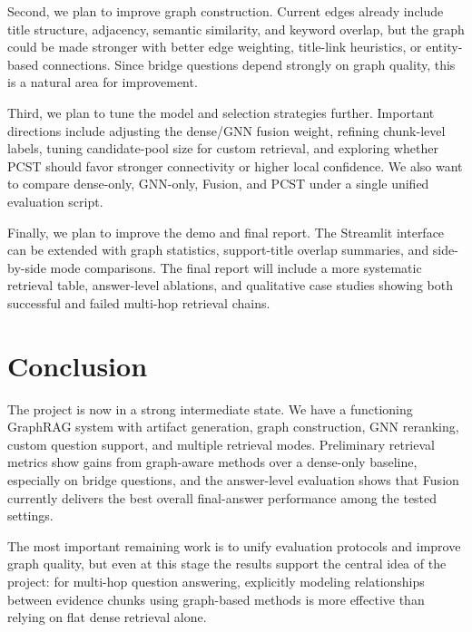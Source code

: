 \documentclass[10pt]{article}
\begin{document}
Second, we plan to improve graph construction. Current edges already include title structure, adjacency, semantic similarity, and keyword overlap, but the graph could be made stronger with better edge weighting, title-link heuristics, or entity-based connections. Since bridge questions depend strongly on graph quality, this is a natural area for improvement.

Third, we plan to tune the model and selection strategies further. Important directions include adjusting the dense/GNN fusion weight, refining chunk-level labels, tuning candidate-pool size for custom retrieval, and exploring whether PCST should favor stronger connectivity or higher local confidence. We also want to compare dense-only, GNN-only, Fusion, and PCST under a single unified evaluation script.

Finally, we plan to improve the demo and final report. The Streamlit interface can be extended with graph statistics, support-title overlap summaries, and side-by-side mode comparisons. The final report will include a more systematic retrieval table, answer-level ablations, and qualitative case studies showing both successful and failed multi-hop retrieval chains.

\section{Conclusion}

The project is now in a strong intermediate state. We have a functioning GraphRAG system with artifact generation, graph construction, GNN reranking, custom question support, and multiple retrieval modes. Preliminary retrieval metrics show gains from graph-aware methods over a dense-only baseline, especially on bridge questions, and the answer-level evaluation shows that Fusion currently delivers the best overall final-answer performance among the tested settings.

The most important remaining work is to unify evaluation protocols and improve graph quality, but even at this stage the results support the central idea of the project: for multi-hop question answering, explicitly modeling relationships between evidence chunks using graph-based methods is more effective than relying on flat dense retrieval alone.
\end{document}
